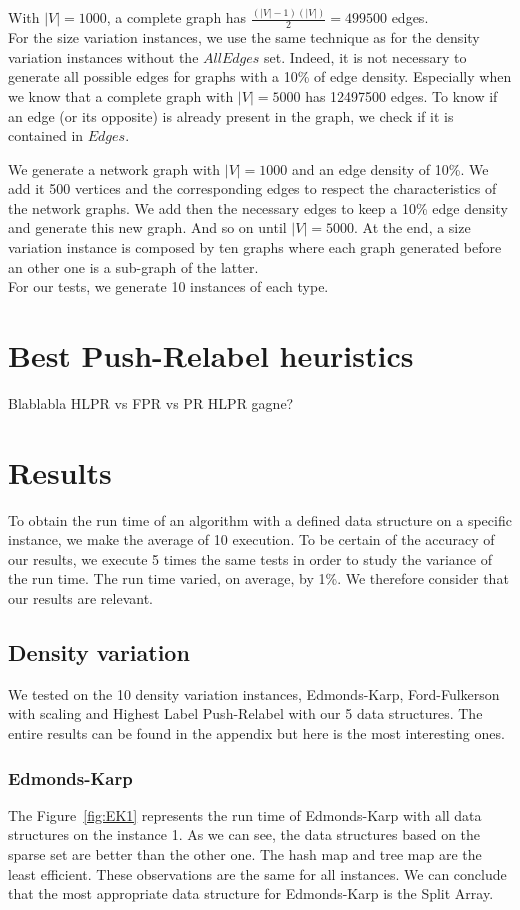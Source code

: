 With $|V|=1000$, a complete graph has $\frac{(|V|-1)(|V|)}{2} = 499500$ edges.\\

For the size variation instances, we use the same technique as for the density variation instances without the $AllEdges$ set. Indeed, it is not necessary to generate all possible edges for graphs with a 10\% of edge density. Especially when we know that a complete graph with $|V|=5000$ has 12497500 edges. To know if an edge (or its opposite) is already present in the graph, we check if it is contained in $Edges$.

We generate a network graph with $|V|=1000$ and an edge density of 10\%. We add it 500 vertices and the corresponding edges to respect the characteristics of the network graphs. We add then the necessary edges to keep a 10\% edge density and generate this new graph. And so on until $|V|=5000$. At the end, a size variation instance is composed by ten graphs where each graph generated before an other one is a sub-graph of the latter. \\

For our tests, we generate 10 instances of each type.

\section{Best Push-Relabel heuristics}
Blablabla HLPR vs FPR vs PR
HLPR gagne?

\section{Results}
To obtain the run time of an algorithm with a defined data structure on a specific instance, we make the average of 10 execution. To be certain of the accuracy of our results, we execute 5 times the same tests in order to study the variance of the run time. The run time varied, on average, by 1\%. We therefore consider that our results are relevant.

\subsection{Density variation}
We tested on the 10 density variation instances, Edmonds-Karp, Ford-Fulkerson with scaling and Highest Label Push-Relabel with our 5 data structures. The entire results can be found in the appendix but here is the most interesting ones.

\subsubsection{Edmonds-Karp}
The Figure~\ref{fig:EK1} represents the run time of Edmonds-Karp with all data structures on the instance 1. As we can see, the data structures based on the sparse set are better than the other one. The hash map and tree map are the least efficient. These observations are the same for all instances. We can conclude that the most appropriate data structure for Edmonds-Karp is the Split Array.

